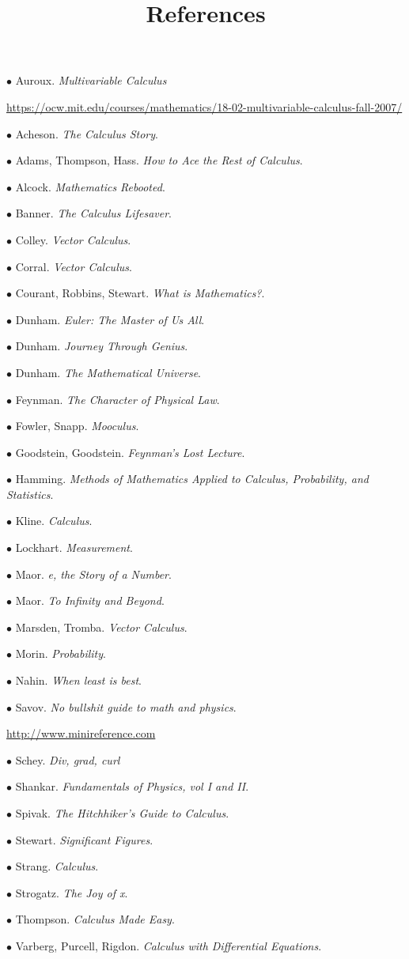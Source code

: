 \documentclass[11pt, oneside]{article}   	%
\title{References}
\date{}
\begin{document}
\maketitle
\Large

$\bullet$ Auroux.  \emph{Multivariable Calculus}

\url{https://ocw.mit.edu/courses/mathematics/18-02-multivariable-calculus-fall-2007/}

$\bullet$ Acheson.  \emph{The Calculus Story}.

$\bullet$ Adams, Thompson, Hass. \emph{How to Ace the Rest of Calculus}.

$\bullet$ Alcock. \emph{Mathematics Rebooted}.

$\bullet$ Banner. \emph{The Calculus Lifesaver}.

$\bullet$ Colley. \emph{Vector Calculus}.

$\bullet$ Corral. \emph{Vector Calculus}.

$\bullet$ Courant, Robbins, Stewart. \emph{What is Mathematics?}.

$\bullet$ Dunham. \emph{Euler:  The Master of Us All}.

$\bullet$ Dunham. \emph{Journey Through Genius}.

$\bullet$ Dunham. \emph{The Mathematical Universe}.

$\bullet$ Feynman. \emph{The Character of Physical Law}.

$\bullet$ Fowler, Snapp. \emph{Mooculus}.

$\bullet$ Goodstein, Goodstein. \emph{Feynman's Lost Lecture}.

$\bullet$ Hamming.  \emph{Methods of Mathematics Applied to Calculus, Probability, and Statistics}.

$\bullet$ Kline. \emph{Calculus}.

$\bullet$ Lockhart. \emph{Measurement}.

$\bullet$ Maor. \emph{e, the Story of a Number}.

$\bullet$ Maor. \emph{To Infinity and Beyond}.

$\bullet$ Marsden, Tromba. \emph{Vector Calculus}.

$\bullet$ Morin. \emph{Probability}.

$\bullet$ Nahin. \emph{When least is best}.

$\bullet$ Savov. \emph{No bullshit guide to math and physics}.

\url{http://www.minireference.com}

$\bullet$ Schey.  \emph{Div, grad, curl}

$\bullet$ Shankar.  \emph{Fundamentals of Physics, vol I and II}.

$\bullet$ Spivak.  \emph{The Hitchhiker's Guide to Calculus}.

$\bullet$ Stewart.  \emph{Significant Figures}.

$\bullet$ Strang.  \emph{Calculus}.

$\bullet$ Strogatz.  \emph{The Joy of x}.

$\bullet$ Thompson.  \emph{Calculus Made Easy}.

$\bullet$ Varberg, Purcell, Rigdon.  \emph{Calculus with Differential Equations}.
\end{document}
